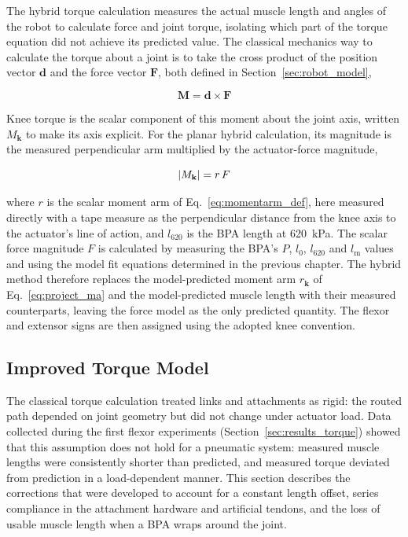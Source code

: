 The hybrid torque calculation measures the actual muscle length and angles of the robot to calculate force and joint torque, isolating which part of the torque equation did not achieve its predicted value. The classical mechanics way to calculate the torque about a joint is to take the cross product of the position vector $\mathbf{d}$ and the force vector $\mathbf{F}$, both defined in Section~\ref{sec:robot_model},

\begin{equation}
    \mathbf{M} = \mathbf{d} \times \mathbf{F} \label{eq:M_vec}
\end{equation}

Knee torque is the scalar component of this moment about the joint axis, written $M_{\mathbf{k}}$ to make its axis explicit. For the planar hybrid calculation, its magnitude is the measured perpendicular arm multiplied by the actuator-force magnitude,

\begin{equation}
    \lvert M_{\mathbf{k}}\rvert = r\,F \label{eq:M_scalar}
\end{equation}

where $r$ is the scalar moment arm of Eq.~\eqref{eq:momentarm_def}, here measured directly with a tape measure as the perpendicular distance from the knee axis to the actuator's line of action, and $l_{620}$ is the BPA length at \qty{620}{\kPa}. The scalar force magnitude $F$ is calculated by measuring the BPA's $P$, $l_{0}$, $l_{620}$ and $l_\text{m}$ values and using the model fit equations determined in the previous chapter. The hybrid method therefore replaces the model-predicted moment arm $r_{\mathbf{k}}$ of Eq.~\eqref{eq:project_ma} and the model-predicted muscle length with their measured counterparts, leaving the force model as the only predicted quantity. The flexor and extensor signs are then assigned using the adopted knee convention.

\subsection{Improved Torque Model}\label{sec:improved_model}

The classical torque calculation treated links and attachments as rigid: the routed path depended on joint geometry but did not change under actuator load. Data collected during the first flexor experiments (Section~\ref{sec:results_torque}) showed that this assumption does not hold for a pneumatic system: measured muscle lengths were consistently shorter than predicted, and measured torque deviated from prediction in a load-dependent manner. This section describes the corrections that were developed to account for a constant length offset, series compliance in the attachment hardware and artificial tendons, and the loss of usable muscle length when a BPA wraps around the joint.

